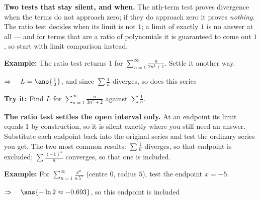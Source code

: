 \documentclass[12pt]{article}
\begin{document}


\begin{formulabox}
\textbf{Two tests that stay silent, and when.} The nth-term test proves divergence when the terms do not approach zero; if they do approach zero it proves \emph{nothing}. The ratio test decides when its limit is not $1$; a limit of exactly $1$ is no answer at all --- and for terms that are a ratio of polynomials it is guaranteed to come out $1$, so start with limit comparison instead.
\end{formulabox}

\begin{examplebox}
\textbf{Example:} \quad The ratio test returns $1$ for $\displaystyle\sum_{n=1}^{\infty}\frac{n}{2n^{2}+1}$. Settle it another way.

$\Rightarrow\quad L = \ans{\frac{1}{2}}$, and since $\sum \frac{1}{n}$ diverges, so does this series
\end{examplebox}

\begin{tryitbox}
\textbf{Try it:} \quad Find $L$ for $\displaystyle\sum_{n=1}^{\infty}\frac{n}{3n^{2}+2}$ against $\displaystyle\sum\frac{1}{n}$.\\[2pt]
\end{tryitbox}


\begin{formulabox}
\textbf{The ratio test settles the open interval only.} At an endpoint its limit equals $1$ by construction, so it is silent exactly where you still need an answer. Substitute each endpoint back into the original series and test the ordinary series you get. The two most common results: $\sum \frac1n$ diverges, so that endpoint is excluded; $\sum \frac{(-1)^{n}}{n}$ converges, so that one is included.
\end{formulabox}

\begin{examplebox}
\textbf{Example:} \quad For $\displaystyle\sum_{n=1}^{\infty}\frac{x^{n}}{n\,5^{n}}$ (centre $0$, radius $5$), test the endpoint $x = -5$.

$\Rightarrow\quad \ans{-\ln 2 \approx -0.693}$, so this endpoint is included
\end{examplebox}
\end{document}
